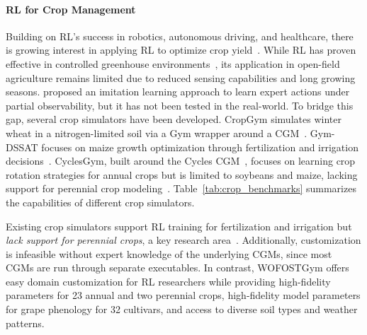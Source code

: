 \paragraph{RL for Crop Management}
Building on RL's success in robotics, autonomous driving, and healthcare, there is growing interest in applying RL to optimize crop yield~\citep{binas_reinforcement_2019}. While RL has proven effective in controlled greenhouse environments~\citep{an_simulator-based_2021}, its application in open-field agriculture remains limited due to reduced sensing capabilities and long growing seasons. \citet{tao_optimizing_2023} proposed an imitation learning approach to learn expert actions under partial observability, but it has not been tested in the real-world. To bridge this gap, several crop simulators have been developed. CropGym simulates winter wheat in a nitrogen-limited soil via a Gym wrapper around a CGM~\citep{overweg_cropgym_2021}. Gym-DSSAT focuses on maize growth optimization through fertilization and irrigation decisions~\citep{gautron_gym-dssat_2022}. CyclesGym, built around the Cycles CGM~\citep{kemanian_cycles_2022}, focuses on learning crop rotation strategies for annual crops but is limited to soybeans and maize, lacking support for perennial crop modeling~\citep{turchetta_learning_2022}. Table~\ref{tab:crop_benchmarks} summarizes the capabilities of different crop simulators.

Existing crop simulators support RL training for fertilization and irrigation but \emph{lack support for perennial crops}, a key research area~\citep{gautron_reinforcement_2022}. Additionally, customization is infeasible without expert knowledge of the underlying CGMs, since most CGMs are run through separate executables. In contrast, WOFOSTGym offers easy domain customization for RL researchers while providing high-fidelity parameters for 23 annual and two perennial crops, high-fidelity model parameters for grape phenology for 32 cultivars, and access to diverse soil types and weather patterns.

